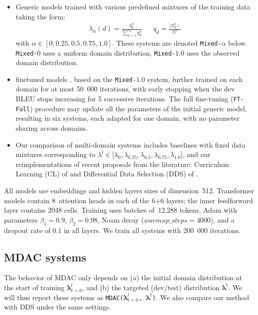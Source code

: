 \documentclass[11pt]{article}
\newcommand{\fyTodo}[1]{\Todo[FY:]{\textcolor{orange}{#1}}}
\newcommand{\fyDone}[1]{\done[FY]\Todo[FY:]{\textcolor{orange}{#1}}}
\newcommand{\system}[1]{\texttt{{#1}}}
\newcommand{\vlambda}{\ensuremath{\boldsymbol\lambda}\xspace} %
\begin{document}
\begin{itemize}
\itemsep0em 
\item Generic models trained with various predefined mixtures of the training data taking the form:
\begin{align} \label{mixture:trn}
\lambda_{\alpha}(d) = \frac{q_d^{\alpha}}{\displaystyle{\mathop{\sum}_{d=1}^{n_d}q_d^{\alpha}}} &&
q_d = \frac{\mid N^{s}_d \mid}{\displaystyle{N^{s}}} %
\end{align} \setlength{\abovedisplayskip}{2pt}
\setlength{\belowdisplayskip}{2pt} 
with $\alpha \in [0,0.25,0.5,0.75,1.0]$. These systems are denoted \system{Mixed-$\alpha$} below. \system{Mixed-$0$} uses a uniform domain distribution, \system{Mixed-$1.0$} uses the observed domain distribution.
\item finetuned models \citep{Luong15stanford,Freitag16fast}, based on the \system{Mixed-$1.0$} system, further trained on each domain for at most 50~000 iterations, with early stopping when the dev BLEU stops increasing for 5 successive iterations.\fyDone{for ?? iterations} The full fine-tuning (\system{FT-Full}) procedure may update all the parameters of the initial generic model, resulting in six systems, each adapted for one domain, with no parameter sharing across domains.
\item Our comparison of multi-domain systems\fyTodo{CL is only dynamic ?} includes baselines with fixed data mixtures corresponding to $\lambda^l \in \big[ \lambda_0, \lambda_{0.25}, \lambda_{0.5}, \lambda_{0.75}, \lambda_{1.0}\big]$, and our reimplementations of recent proposals from the literature: Curriculum Learning (CL) of \citet{Zhang19curriculum} and Differential Data Selection (DDS) of \citet{Wang20balancing}.
\end{itemize}

All models use embeddings and hidden layers sizes of dimension~512. Transformer models contain 8~attention heads in each of the 6+6 layers; the inner feedforward layer contains 2048 cells. Training uses batches of~12,288 tokens, Adam with parameters $\beta_1=0.9$, $\beta_2= 0.98$, Noam decay ($warmup\_steps=4000$), and a dropout rate of $0.1$ in all layers. We train all systems with 200~000 iterations.

\subsection{MDAC systems} \label{ssec:dds-sys}
The behavior of MDAC only depends on (a) the initial domain distribution at the start of training $\vlambda^{l}_{t=0}$, and (b) the targeted (dev/test) distribution $\vlambda^{t}$. We will thus report these systems as \system{MDAC($\vlambda^{l}_{t=0}$, $\vlambda^{t}$)}. We also compare our method with DDS under the same settings.
\end{document}
